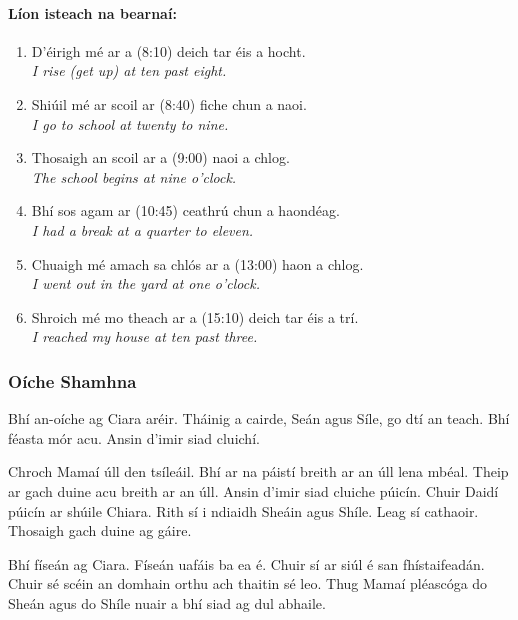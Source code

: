 \documentclass[article,a4paper,oneside,12pt]{memoir}
\begin{document}
\clearpage

\paragraph{Líon isteach na bearnaí:}

\begin{enumerate}
  \item D'\'{e}irigh m\'{e} ar a (8:10) deich tar \'{e}is a hocht.\\
	\emph{I rise (get up) at ten past eight.}
  \item Shiúil m\'{e} ar scoil ar (8:40) fiche chun a naoi.\\
	\emph{I go to school at twenty to nine.}
  \item Thosaigh an scoil ar a (9:00) naoi a chlog.\\
    	\emph{The school begins at nine o'clock.}
  \item Bhí sos agam ar (10:45) ceathrú chun a haond\'{e}ag.\\
	\emph{I had a break at a quarter to eleven.}
  \item Chuaigh m\'{e} amach sa chlós ar a (13:00) haon a chlog.\\
	\emph{I went out in the yard at one o'clock.}
  \item Shroich m\'{e} mo theach ar a (15:10) deich tar \'{e}is a trí.\\
	\emph{I reached my house at ten past three.}
\end{enumerate}

\clearpage

\subsubsection{Oíche Shamhna}

Bhí an-oíche ag Ciara ar\'{e}ir. Tháinig a cairde, Seán agus Síle, go dtí an teach. Bhí f\'{e}asta mór acu. Ansin d'imir siad cluichí.

Chroch Mamaí úll den tsíleáil. Bhí ar na páistí breith ar an úll lena mb\'{e}al. Theip ar gach duine acu breith ar an úll. Ansin d'imir siad cluiche púicín. Chuir Daidí púicín ar shúile Chiara. Rith sí i ndiaidh Sheáin agus Shíle. Leag sí cathaoir. Thosaigh gach duine ag gáire.

Bhí físeán ag Ciara. Físeán uafáis ba ea \'{e}. Chuir sí ar siúl \'{e} san fhístaifeadán. Chuir s\'{e} sc\'{e}in an domhain orthu ach thaitin s\'{e} leo. Thug Mamaí pl\'{e}ascóga do Sheán agus do Shíle nuair a bhí siad ag dul abhaile.
\end{document}
